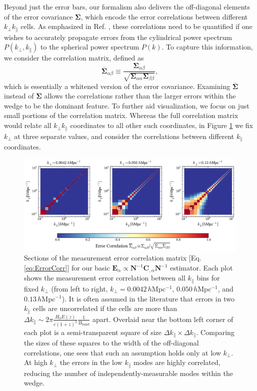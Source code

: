 \documentclass[twocolumn,aps,prd,nofootinbib,showpacs]{revtex4-1}
\begin{document}
Beyond just the error bars, our formalism also delivers the off-diagonal elements of the error covariance $\boldsymbol \Sigma$, which encode the error correlations between different $k_\perp k_\parallel$ cells.  As emphasized in Ref. \cite{Dillon2014}, these correlations need to be quantified if one wishes to accurately propagate errors from the cylindrical power spectrum $P(k_\perp, k_\parallel)$ to the spherical power spectrum $P(k)$.  To capture this information, we consider the correlation matrix, defined as
\begin{equation}
\label{eq:ErrorCorr}
\overline{\boldsymbol \Sigma}_{\alpha \beta} \equiv \frac{\boldsymbol \Sigma_{\alpha \beta}}{\sqrt{\boldsymbol \Sigma_{\alpha \alpha} \boldsymbol \Sigma_{\beta \beta}}},
\end{equation}
which is essentially a whitened version of the error covariance.  Examining $\overline{\boldsymbol \Sigma}$ instead of $\boldsymbol \Sigma$ allows the correlations rather than the larger errors within the wedge to be the dominant feature.  To further aid visualization, we focus on just small portions of the correlation matrix.  Whereas the full correlation matrix would relate all $k_\perp k_\parallel$ coordinates to all other such coordinates, in Figure \ref{fig:basicEstCovar} we fix $k_\perp$ at three separate values, and consider the correlations between different $k_\parallel$ coordinates.

\begin{figure}[!ht] 
	\centering 
	\includegraphics[width=1\textwidth]{simpleEstCovar.pdf}
	\caption{Sections of the measurement error correlation matrix [Eq. \eqref{eq:ErrorCorr}] for our basic $\mathbf{E}_\alpha \propto \mathbf{N}^{-1} \mathbf{C}_{,\alpha} \mathbf{N}^{-1}$ estimator.  Each plot shows the measurement error correlation between all $k_\parallel$ bins for fixed $k_\perp$ (from left to right, $k_\perp = 0.0042\,h$Mpc$^{-1}$, $0.050\,h$Mpc$^{-1}$, and $0.13\,h$Mpc$^{-1}$).  It is often assumed in the literature that errors in two $k_\parallel$ cells are uncorrelated if the cells are more than $\Delta k_\parallel \sim 2\pi \frac{ H_0 E(z)}{c (1+z)^2} \frac{1}{B_\textrm{band}}$ apart.  Overlaid near the bottom left corner of each plot is a semi-transparent square of size $\Delta k_\parallel \times \Delta k_\parallel$.  Comparing the sizes of these squares to the width of the off-diagonal correlations, one sees that such an assumption holds only at low $k_\perp$.  At high $k_\perp$ the errors in the low $k_\parallel$ modes are highly correlated, reducing the number of independently-measurable modes within the wedge.}
	\label{fig:basicEstCovar}
\end{figure} 
\end{document}
